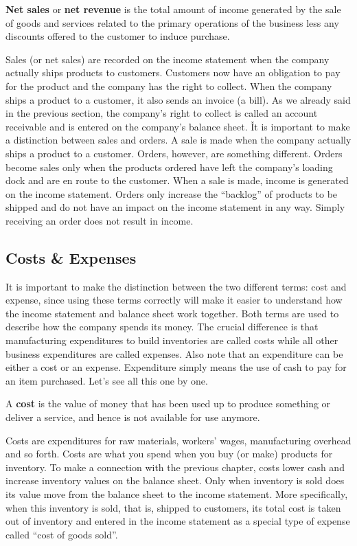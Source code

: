 \textbf{Net sales} or \textbf{net revenue} is the total amount of income generated by the sale of goods and services
related to the primary operations of the business less any discounts offered to the customer to induce purchase.
\ed

Sales (or net sales) are recorded on the income statement when the company actually ships products to customers.
Customers now have an obligation to pay for the product and the company has the right to collect. When the company
ships a product to a customer, it also sends an invoice (a bill). As we already said in the previous section, the
company's right to collect is called an account receivable and is entered on the company's balance sheet. \v

It is important to make a distinction between sales and orders. A sale is made when the company actually ships a
product to a customer. Orders, however, are something different. Orders become sales only when the products ordered
have left the company's loading dock and are en route to the customer. When a sale is made, income is generated on
the income statement. Orders only increase the ``backlog'' of products to be shipped and do not have an impact on the
income statement in any way. Simply receiving an order does not result in income.

\subsection{Costs \& Expenses}

It is important to make the distinction between the two different terms: cost and expense, since using these terms
correctly will make it easier to understand how the income statement and balance sheet work together. Both terms are
used to describe how the company spends its money. The crucial difference is that manufacturing expenditures to build
inventories are called costs while all other business expenditures are called expenses. Also note that an expenditure
can be either a cost or an expense. Expenditure simply means the use of cash to pay for an item purchased. Let's see
all this one by one.

\bd[Cost]
A \textbf{cost} is the value of money that has been used up to produce something or deliver a service, and hence is not
available for use anymore.
\ed

Costs are expenditures for raw materials, workers' wages, manufacturing overhead and so forth. Costs are what you
spend when you buy (or make) products for inventory. To make a connection with the previous chapter, costs lower cash
and increase inventory values on the balance sheet. Only when inventory is sold does its value move from the balance
sheet to the income statement. More specifically, when this inventory is sold, that is, shipped to customers, its
total cost is taken out of inventory and entered in the income statement as a special type of expense called ``cost
of goods sold''.

